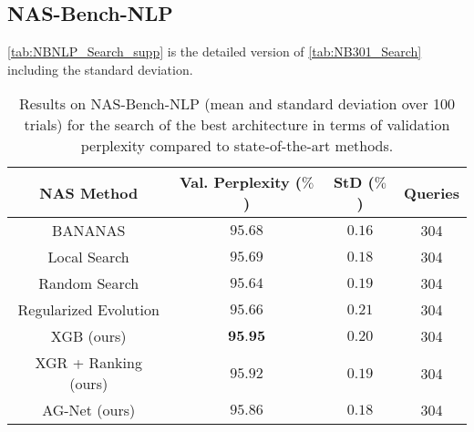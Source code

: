 \documentclass[runningheads]{llncs}
\begin{document}
\subsection{NAS-Bench-NLP}
\autoref{tab:NBNLP_Search_supp} is the detailed version of \autoref{tab:NB301_Search} including the standard deviation.
\begin{table}[t]
	\caption{Results on NAS-Bench-NLP (mean and standard deviation over 100 trials) for the search of the best architecture in terms of validation perplexity compared to state-of-the-art methods.}
	\label{tab:NBNLP_Search_supp}
	\scriptsize
	\begin{center}
		\begin{tabular}{c||c|c || c}
			\toprule
			\textbf{NAS Method}  & \textbf{Val. Perplexity} ($\%$) & \textbf{StD} ($\%$) & \textbf{Queries} \\
			\midrule
			BANANAS\textsuperscript{\textdagger} \cite{2021BANANAS} & $95.68$  & $0.16$  & 304 \\
			Local Search\textsuperscript{\textdagger} \cite{2020LocalSearchNAS} & $95.69$ & $0.18$ & 304\\
			Random Search\textsuperscript{\textdagger}\cite{2019RS}  & $95.64$ & $0.19$ & 304 \\
			Regularized Evolution\textsuperscript{{\textdagger}}\cite{2019EvolutionaryNAS}  & $95.66$ &  $0.21$& 304 \\
			\midrule
			XGB (ours) & $\textbf{95.95}$ & $0.20$ & 304 \\
			XGR + Ranking (ours) & $95.92$ & $0.19$& 304 \\
			\midrule
			AG-Net (ours)  & $95.86$ & $0.18$ & 304
			\\
			\bottomrule
		\end{tabular}
	\end{center}
\end{table}
\end{document}
